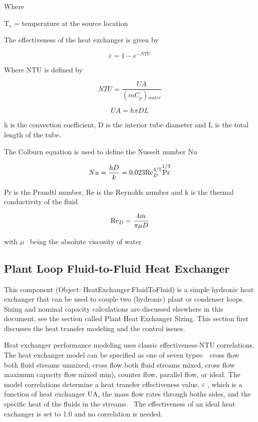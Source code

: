 Where

T\(_{s}\) = temperature at the source location

The effectiveness of the heat exchanger is given by

\begin{equation}
\varepsilon  = 1 - {e^{ - NTU}}
\end{equation}

Where NTU is defined by

\begin{equation}
NTU = \frac{{UA}}{{(\dot mC{}_p){}_{water}}}
\end{equation}

\begin{equation}
UA = h\pi DL
\end{equation}

h is the convection coefficient, D is the interior tube diameter and L is the total length of the tube.

The Colburn equation is used to define the Nusselt number Nu

\begin{equation}
Nu = \frac{{hD}}{k} = 0.023{\mathop{\rm Re}\nolimits} {{}_D^{4/5}}{\Pr ^{1/3}}
\end{equation}

Pr is the Prandtl number, Re is the Reynolds number and k is the thermal conductivity of the fluid

\begin{equation}
{\mathop{\rm Re}\nolimits} {}_D = \frac{{4\dot m}}{{\pi \mu D}}
\end{equation}

with \(\mu\) ~being the absolute viscosity of water

\subsection{Plant Loop Fluid-to-Fluid Heat Exchanger}\label{plant-loop-fluid-to-fluid-heat-exchanger}

This component (Object: HeatExchanger:FluidToFluid) is a simple hydronic heat exchanger that can be used to couple two (hydronic) plant or condenser loops.~ Sizing and nominal capacity calculations are discussed elsewhere in this document, see the section called Plant Heat Exchanger Sizing. This section first discusses the heat transfer modeling and the control issues.

Heat exchanger performance modeling uses classic effectiveness-NTU correlations. The heat exchanger model can be specified as one of seven types: ~cross flow both fluid streams unmixed, cross flow both fluid streams mixed, cross flow maximum capacity flow mixed min), counter flow, parallel flow, or ideal. The model correlations determine a heat transfer effectiveness value, \(\varepsilon\) , which is a function of heat exchanger UA, the mass flow rates through boths sides, and the specific heat of the fluids in the streams.~ The effectiveness of an ideal heat exchanger is set to 1.0 and no correlation is needed.

